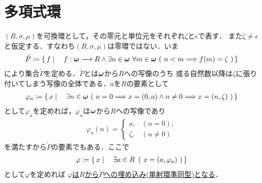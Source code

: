 \section{多項式環}
	$(R,\sigma,\mu)$を可換環として，その零元と単位元をそれぞれ$\zeta$と$\epsilon$で表す．
	また$\zeta \neq \epsilon$と仮定する．すなわち$(R,\sigma,\mu)$は零環ではない．いま
	\begin{align}
		\tilde{P} \coloneqq \left\{\, f \mid \quad f:{\boldsymbol \omega} \longrightarrow R \wedge 
		\exists n \in {\boldsymbol \omega}\ \forall m \in {\boldsymbol \omega}\ (\ n < m \Longrightarrow f(m) = \zeta\ )\, \right\}
	\end{align}
	により集合$\tilde{P}$を定める．$\tilde{P}$とは${\boldsymbol \omega}$から$R$への写像のうち
	或る自然数以降は$\zeta$に張り付いてしまう写像の全体である．$a$を$R$の要素として
	\begin{align}
		\varphi_a \coloneqq \left\{\, x \mid \quad \exists n \in {\boldsymbol \omega}\ (\ n = 0 \Longrightarrow x = (0,a)
		\wedge n \neq 0 \Longrightarrow x = (n,\zeta)\ )\, \right\}
	\end{align}
	として$\varphi_a$を定めれば，$\varphi_a$は${\boldsymbol \omega}$から$R$への写像であり
	\begin{align}
		\varphi_a(n) = 
		\begin{cases}
			a, & (n=0), \\
			\zeta, & (n \neq 0)
		\end{cases}
	\end{align}
	を満たすから$\tilde{P}$の要素でもある．ここで
	\begin{align}
		\varphi \coloneqq \Set{x}{\exists a \in R\ \left(\ x=(a,\varphi_a)\ \right)}
	\end{align}
	として$\varphi$を定めれば
	\underline{$\varphi$は$R$から$\tilde{P}$への埋め込み(単射環準同型)となる}．
	
	\begin{prf}
	\end{prf}
	
